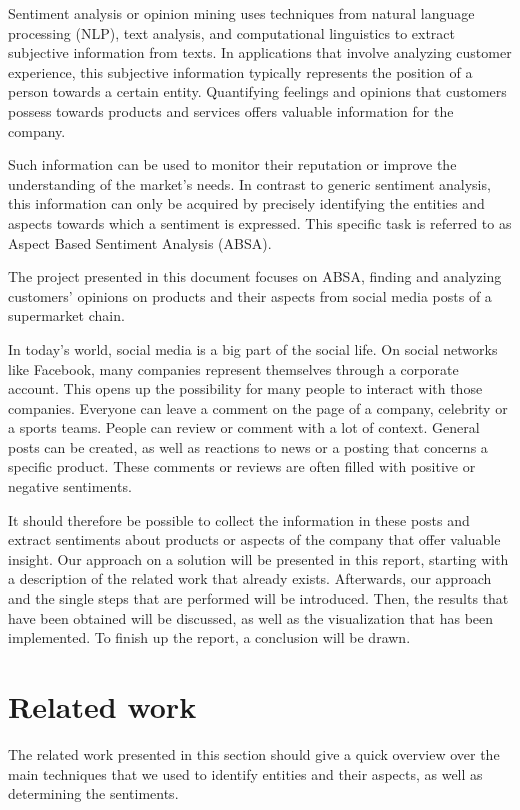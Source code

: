 \documentclass[10pt,a4paper]{article}
\begin{document}
	Sentiment analysis or opinion mining uses techniques from natural language processing (NLP), text analysis, and computational linguistics to extract subjective information from texts. In applications that involve analyzing customer experience, this subjective information typically represents the position of a person towards a certain entity. Quantifying feelings and opinions that customers possess towards products and services offers valuable information for the company. 
	
	Such information can be used to monitor their reputation or improve the understanding of the market's needs. In contrast to generic sentiment analysis, this information can only be acquired by precisely identifying the entities and aspects towards which a sentiment is expressed. This specific task is referred to as  Aspect Based Sentiment Analysis (ABSA).
	
	The project presented in this document focuses on ABSA, finding and analyzing customers' opinions on products and their aspects from social media posts of a supermarket chain.
	
	 In today's world, social media is a big part of the social life. On social networks like Facebook, many companies represent themselves through a corporate account. This opens up the possibility for many people to interact with those companies. Everyone can leave a comment on the page of a company, celebrity or a sports teams. People can review or comment with a lot of context. General posts can be created, as well as reactions to news or a posting that concerns a specific product. These comments or reviews are often filled with positive or negative sentiments. 
	 
	 It should therefore be possible to collect the information in these posts and extract sentiments about products or aspects of the company that offer valuable insight. Our approach on a solution will be presented in this report, starting with a description of the related work that already exists. Afterwards, our approach and the single steps that are performed will be introduced. Then, the results that have been obtained will be discussed, as well as the visualization that has been implemented. To finish up the report, a conclusion will be drawn.
		
	\section{Related work}
	The related work presented in this section should give a quick overview over the main techniques that we used to identify entities and their aspects, as well as determining the sentiments.
		
\end{document}
